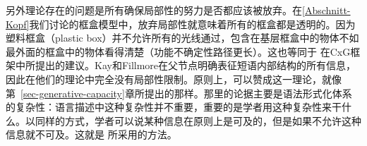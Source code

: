 另外理论存在的问题是所有确保局部性的努力是否都应该被放弃。在\ref{Abschnitt-Kopf}我们讨论的框盒模型中，放弃局部性就意味着所有的框盒都是透明的。因为塑料框盒（plastic box）并不允许所有的光线通过，包含在基层框盒中的物体不如最外面的框盒中的物体看得清楚（功能不确定性路径更长）。这也等同于 \citet{KF99a}在CxG\indexcxgc 框架中所提出的建议。Kay和Fillmore在父节点明确表征短语内部结构的所有信息，因此在他们的理论中完全没有局部性限制。原则上，可以赞成这一理论，就像第~\ref{sec-generative-capacity}章所提出的那样。那里的论据主要是语法形式化体系的复杂性：语言描述中这种复杂性并不重要，重要的是学者用这种复杂性来干什么。以同样的方式，学者可以说某种信息在原则上是可及的，但是如果不允许这种信息就不可及。这就是 \citet[--145]{ps}所采用的方法。

